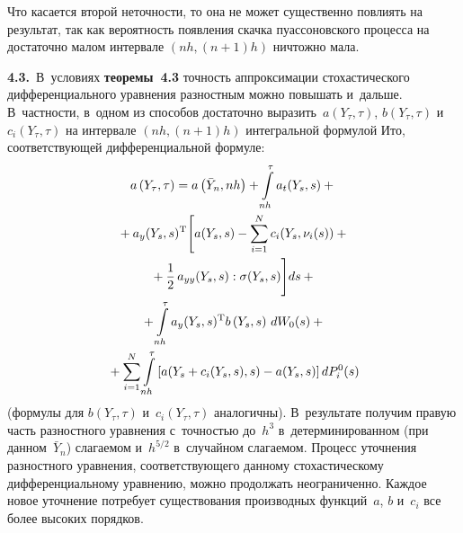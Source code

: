 \begin{multicols}{2}
Что касается второй неточности, то она не может существенно повлиять
на результат, так как вероятность появления скачка пуассоновского
процесса на достаточно малом интервале $(nh,(n+1)h)$ ничтожно мала.

\textbf{4.3.}\ В~условиях \textbf{теоремы~4.3} точность аппроксимации стохастического 
дифференциального уравнения разностным можно  повышать и~дальше. В~частности, в~одном из способов
достаточно выразить~$a(Y_{\tau},\tau)$,
$b(Y_{\tau},\tau)$ и~$c_i(Y_{\tau},\tau)$ на интервале $(nh,(n+1)h)$
интегральной формулой Ито, соответствующей дифференциальной формуле:
   \begin{multline}
   a\left(Y_{\tau},\tau\right)=a\left(\bar Y_n,nh\right)+\int\limits_{nh}^{\tau} a_t(Y_s,s)+{}\\
   {}+
    a_y(Y_s,s)^{\mathrm{T}}\Biggl[ a(Y_s,s)-\sum\limits_{i=1}^N c_i(Y_s,\nu_i(s))+{}\\
    {}+\displaystyle\frac{\displaystyle 1\mathstrut}{\displaystyle 2\mathstrut}\,a_{yy}(Y_s,s):
    \sigma(Y_s,s)\Biggr]ds+{}\\
    {}+\int\limits_{nh}^{\tau}a_y(Y_s,s)^{\mathrm{T}}  b\left(Y_s,s\right)\,dW_0(s)+{}\\
{}+\sum\limits_{i=1}^N \int\limits_{nh}^{\tau}
    \left[a(Y_s+c_i(Y_s,s),s)-a(Y_s,s)\right]dP_i^0(s) \label{e4.19-s}
    \end{multline}
(формулы для $b(Y_{\tau},\tau)$ и~$c_i(Y_{\tau},\tau)$ аналогичны). В~результате 
получим правую
часть разностного уравнения с~точностью до~$h^3$ в~детерминированном
(при данном~$\bar Y_n$) сла\-га\-емом и~$h^{5/2}$ в~случайном сла\-га\-емом.
Процесс уточнения разностного уравнения, соответствующего данному
стохастическому дифференциальному уравнению, можно продолжать
неограниченно. Каждое новое уточнение потребует существования
производных функций~$a$, $b$ и~$c_i$ все более высоких порядков.

\smallskip


\end{multicols}
